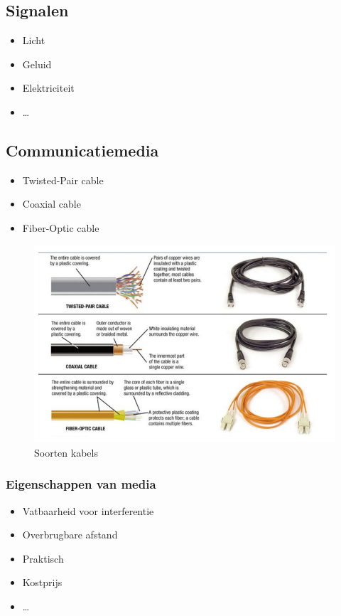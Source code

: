 \documentclass{article}
\begin{document}
\subsection{Signalen}
\begin{itemize}
    \item Licht
    \item Geluid
    \item Elektriciteit
    \item \dots
\end{itemize}

\subsection{Communicatiemedia}
\begin{itemize}
    \item Twisted-Pair cable
    \item Coaxial cable
    \item Fiber-Optic cable
\end{itemize}

\begin{figure}[H]
    \centering
    \includegraphics[width=\textwidth]{Screenshot_20200315_105647.png}
    \caption{Soorten kabels}
\end{figure}


\subsubsection{Eigenschappen van media}
\begin{itemize}
    \item Vatbaarheid voor interferentie
    \item Overbrugbare afstand
    \item Praktisch
    \item Kostprijs
    \item \dots
\end{itemize}
\end{document}
